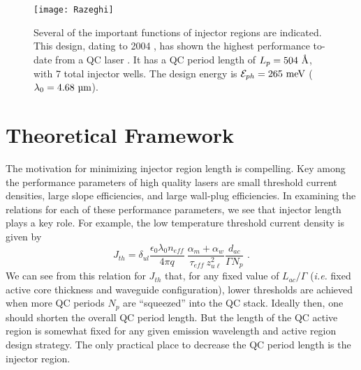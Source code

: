 \begin{figure}[tp]
\centering
\texttt{[image: Razeghi]}
\caption[Conventional QC laser structure]{  Several of the important functions of injector regions are indicated.  This design, dating to 2004 \cite{Evans:APL:2004}, has shown the highest performance to-date from a QC laser \cite{Razeghi:SPIE:2009}.  It has a QC period length of $L_p=504~\textnormal{\AA}$, with 7 total injector wells.  The design energy is $\EE_{ph}=265~\tn{meV}$ ($\lambda_0=4.68~\tn{\um}$).}
\label{chpt4:Razeghi}
\end{figure}


\section{Theoretical Framework}

The motivation for minimizing injector region length is compelling.  Key among the performance parameters of high quality lasers are small threshold current densities, large slope efficiencies, and large wall-plug efficiencies.  In examining the relations for each of these performance parameters, we see that injector length plays a key role.  For example, the low temperature threshold current density is given by
\begin{equation}
 J_{th} = \delta_{ul} \frac{\epsilon_0 \lambda_0 n_\textit{eff}}{4 \pi q} \: \frac{\alpha_m + \alpha_w}{\tau_{\textit{eff}} \: z_{u \ell}^2} \frac{d_{ac}}{\Gamma N_p} \text{~.}
\end{equation}
We can see from this relation for $J_{th}$ that, for any fixed value of $L_{ac}/\Gamma$ (\emph{i.e.} fixed active core thickness and waveguide configuration), lower thresholds are achieved when more QC periods $N_p$ are ``squeezed'' into the QC stack.  Ideally then, one should shorten the overall QC period length.  But the length of the QC active region is somewhat fixed for any given emission wavelength and active region design strategy.  The only practical place to decrease the QC period length is the injector region.

